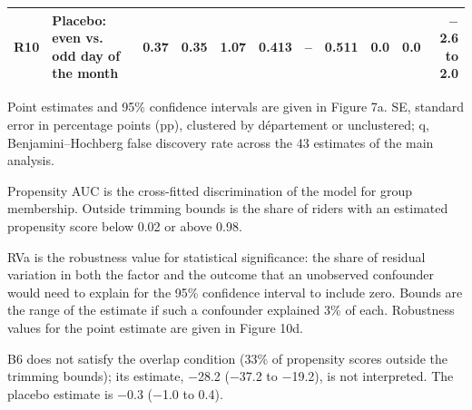 \begin{table}[tp]
\begin{threeparttable}
{\begin{tabular}{lp{4.2cm}rrrrrrrrr}
R10 & Placebo: even vs. odd day of the month & 0.37 & 0.35 & 1.07 & 0.413 & – & 0.511 & 0.0 & 0.0 & $-$2.6 to 2.0 \\
\bottomrule
\end{tabular}}
\begin{tablenotes}[flushleft]\footnotesize
\item Point estimates and 95\% confidence intervals are given in Figure 7a. SE, standard error in percentage points (pp), clustered by département or unclustered; q, Benjamini–Hochberg false discovery rate across the 43 estimates of the main analysis.
\item Propensity AUC is the cross-fitted discrimination of the model for group membership. Outside trimming bounds is the share of riders with an estimated propensity score below 0.02 or above 0.98.
\item RVa is the robustness value for statistical significance: the share of residual variation in both the factor and the outcome that an unobserved confounder would need to explain for the 95\% confidence interval to include zero. Bounds are the range of the estimate if such a confounder explained 3\% of each. Robustness values for the point estimate are given in Figure 10d.
\item B6 does not satisfy the overlap condition (33\% of propensity scores outside the trimming bounds); its estimate, $-$28.2 ($-$37.2 to $-$19.2), is not interpreted. The placebo estimate is $-$0.3 ($-$1.0 to 0.4).
\end{tablenotes}
\end{threeparttable}
\end{table}
